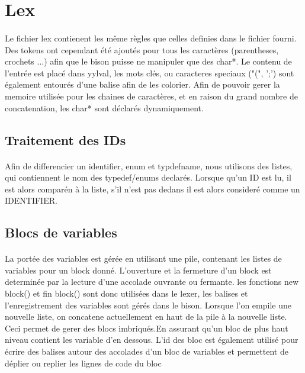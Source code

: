 \documentclass{report}
\begin{document}
	\section{Lex}{
	\paragraph{}{
		Le fichier lex contienent les même règles que celles definies dans le fichier fourni. Des tokens ont cependant été ajoutés pour tous les caractères (parentheses, crochets ...) afin 
		que le bison puisse ne manipuler que des char*. Le contenu de l'entrée est placé dans yylval, les mots clés, ou caracteres speciaux ("(", ';') sont également entourés d'une balise
		afin de les colorier. Afin de pouvoir gerer la memoire utilisée pour les chaines de caractères, et en raison du grand nombre de concatenation, les char* sont déclarés dynamiquement.
		}
		\subsection{Traitement des IDs}{	
	\paragraph{}{
	Afin de differencier un identifier, enum et typdefname, nous utilisons des listes, qui contiennent le nom des typedef/enums declarés. Lorsque qu'un ID est lu, il est alors comparén à
			 la liste, s'il n'est pas dedans il est alors consideré comme un IDENTIFIER.
			 }
		}
		\subsection{Blocs de variables}{
		\paragraph{}{
		La portée des variables est gérée en utilisant une pile, contenant les listes de variables pour un block donné. L'ouverture et la fermeture d'un block est determinée par la lecture d'une accolade ouvrante ou fermante. les fonctions new block() et fin block() sont donc utilisées dans le lexer, les balises et l'enregistrement des variables sont gérés dans le bison. Lorsque l'on empile une nouvelle liste, on concatene actuellement en haut de la pile à la nouvelle liste. Ceci permet de gerer des blocs imbriqués.En assurant qu'un bloc de plus haut niveau contient les variable d'en dessous.
L'id des bloc est également utilisé pour écrire des balises autour des accolades d'un bloc de variables et permettent de déplier ou replier les lignes de code du bloc
			}
			}
}
\end{document}
